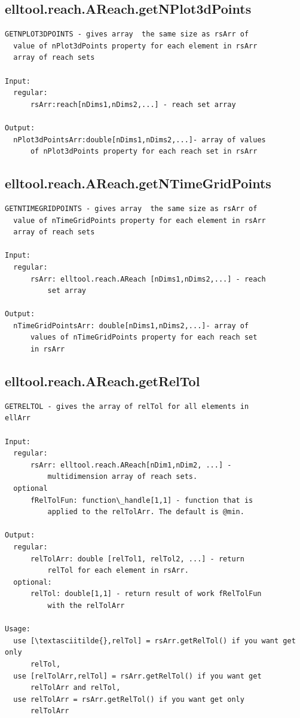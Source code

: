 \documentclass[letterpaper,10pt,english]{sphinxmanual}
\begin{document}
\subsection{elltool.reach.AReach.getNPlot3dPoints}
\label{chap_functions:elltool-reach-areach-getnplot3dpoints}
\begin{Verbatim}[commandchars=\\\{\}]
GETNPLOT3DPOINTS - gives array  the same size as rsArr of
  value of nPlot3dPoints property for each element in rsArr
  array of reach sets

Input:
  regular:
      rsArr:reach[nDims1,nDims2,...] - reach set array

Output:
  nPlot3dPointsArr:double[nDims1,nDims2,...]- array of values
      of nPlot3dPoints property for each reach set in rsArr
\end{Verbatim}


\subsection{elltool.reach.AReach.getNTimeGridPoints}
\label{chap_functions:elltool-reach-areach-getntimegridpoints}
\begin{Verbatim}[commandchars=\\\{\}]
GETNTIMEGRIDPOINTS - gives array  the same size as rsArr of
  value of nTimeGridPoints property for each element in rsArr
  array of reach sets

Input:
  regular:
      rsArr: elltool.reach.AReach [nDims1,nDims2,...] - reach
          set array

Output:
  nTimeGridPointsArr: double[nDims1,nDims2,...]- array of
      values of nTimeGridPoints property for each reach set
      in rsArr
\end{Verbatim}


\subsection{elltool.reach.AReach.getRelTol}
\label{chap_functions:elltool-reach-areach-getreltol}
\begin{Verbatim}[commandchars=\\\{\}]
GETRELTOL - gives the array of relTol for all elements in
ellArr

Input:
  regular:
      rsArr: elltool.reach.AReach[nDim1,nDim2, ...] -
          multidimension array of reach sets.
  optional
      fRelTolFun: function\_handle[1,1] - function that is
          applied to the relTolArr. The default is @min.

Output:
  regular:
      relTolArr: double [relTol1, relTol2, ...] - return
          relTol for each element in rsArr.
  optional:
      relTol: double[1,1] - return result of work fRelTolFun
          with the relTolArr

Usage:
  use [\textasciitilde{},relTol] = rsArr.getRelTol() if you want get only
      relTol,
  use [relTolArr,relTol] = rsArr.getRelTol() if you want get
      relTolArr and relTol,
  use relTolArr = rsArr.getRelTol() if you want get only
      relTolArr
\end{Verbatim}
\end{document}
